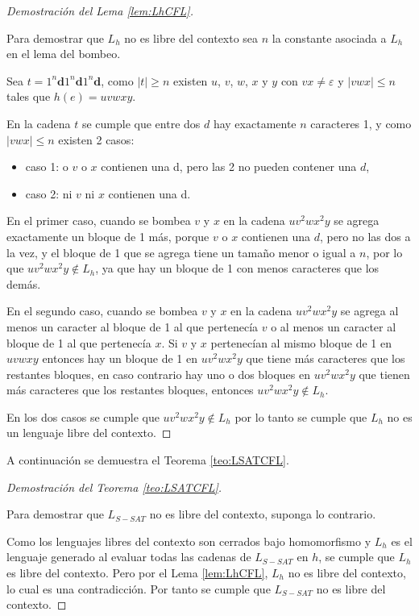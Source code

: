 \begin{proof}[Demostración del Lema \ref{lem:LhCFL}] \
    
    Para demostrar que $L_h$ no es libre del contexto sea $n$ la constante asociada a $L_h$ en el lema del bombeo.
    
    Sea $t=1^n\mathbf{d}1^n\mathbf{d}1^n\mathbf{d}$, como $|t|\geq n$ existen $u$, $v$, $w$, $x$ y $y$ con $vx\neq \varepsilon$ y $|vwx|\leq n$
    tales que $h(e)=uvwxy$.
    
    En la cadena $t$ se cumple que entre dos $d$ hay exactamente $n$ caracteres 1, y como $|vwx|\leq n$ existen 2 casos: 
    \begin{itemize}
        \item caso 1: o $v$ o $x$ contienen una d, pero las 2 no pueden contener una $d$,
        \item caso 2: ni $v$ ni $x$ contienen una d.
    \end{itemize}
    
    
    En el primer caso, cuando se bombea $v$ y $x$ en la cadena $uv^2wx^2y$ se agrega exactamente un bloque de 1 más, porque $v$ o $x$ contienen una $d$, pero no las dos a la vez, y el bloque de 1
    que se agrega tiene un tamaño menor o igual a $n$, por lo que $uv^2wx^2y\notin L_h$, ya que hay un bloque de 1
    con menos caracteres que los demás.
    
    En el segundo caso, cuando se bombea $v$ y $x$ en la cadena $uv^2wx^2y$ se agrega al menos un caracter al bloque de 1 al que pertenecía 
    $v$ o al menos un caracter al bloque de 1 al que pertenecía $x$.  Si $v$ y $x$ pertenecían al mismo bloque 
    de 1 en $uvwxy$ entonces hay un bloque de 1 en $uv^2wx^2y$ que tiene más caracteres que los restantes 
    bloques, en caso contrario hay uno o dos bloques en $uv^2wx^2y$ que tienen más caracteres que los restantes 
    bloques, entonces $uv^2wx^2y\notin L_{h}$.
    
    En los dos casos se cumple que $uv^2wx^2y\notin L_h$ por lo tanto se cumple que $L_h$ no es un lenguaje libre del contexto.
\end{proof}

A continuación se demuestra el Teorema \ref{teo:LSATCFL}.

\begin{proof}[Demostración del Teorema \ref{teo:LSATCFL}] \
    
    Para demostrar que $L_{S-SAT}$ no es libre del contexto, suponga lo contrario. 
    
    Como los lenguajes libres del contexto
    son cerrados bajo homomorfismo y $L_h$ es el lenguaje generado al evaluar todas las cadenas de $L_{S-SAT}$ en $h$, se cumple
    que $L_h$ es libre del contexto. Pero por el Lema \ref{lem:LhCFL}, $L_h$ no es libre del contexto, lo cual es una contradicción.
    Por tanto se cumple que $L_{S-SAT}$ no es libre del contexto.
\end{proof}

